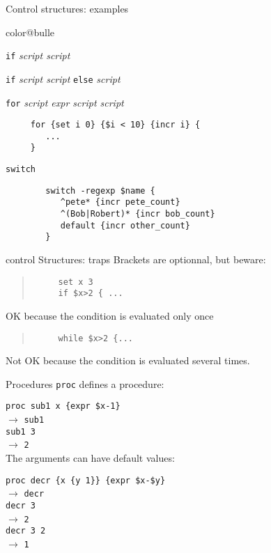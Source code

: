 \documentclass[a4paper,landscape,smooth]{show}
\newcommand{\tclex}[2]{\texttt{#1}\\$\rightarrow$ \texttt{#2}}
\begin{document}
\begin{tslide}{Control structures: examples}
   \vfill
   \begin{bitemize}{color@bulle}
      \item \texttt{if} \emph{script script}
      \item \texttt{if} \emph{script script} \texttt{else} \emph{script}
      \item \texttt{for} \emph{script expr script script} \\
      \begin{verbatim}
	 for {set i 0} {$i < 10} {incr i} {
	    ...
	 }
      \end{verbatim} %
      \item \texttt{switch} \\
	 \begin{verbatim}
	    switch -regexp $name {
	       ^pete* {incr pete_count}
	       ^(Bob|Robert)* {incr bob_count}
	       default {incr other_count}
	    }
	 \end{verbatim} %
   \end{bitemize}
   \vfill
\end{tslide}


\begin{tslide}{control Structures: traps}
   \vfill
   Brackets are optionnal, but beware:
   \begin{quote}
      \begin{verbatim}
	 set x 3
	 if $x>2 { ...
      \end{verbatim} %
   \end{quote} 
   OK because  the condition is  evaluated only once

   \vfill
   \begin{quote}
      \begin{verbatim}
	 while $x>2 {...
      \end{verbatim} %
   \end{quote} 
   Not OK because the condition is evaluated several times.
   \vfill
\end{tslide}



\begin{tslide}{Procedures}
   \vfill
   \texttt{proc} defines a procedure: 

   \tclex{proc sub1 x \{expr \$x-1\}}{sub1}\\
   \tclex{sub1 3}{2}\\

   The arguments can have default values:

   \tclex{proc decr \{x \{y 1\}\} \{expr \$x-\$y\}}{decr}\\
   \tclex{decr 3}{2}\\
   \tclex{decr 3 2}{1}
   \vfill
\end{tslide}
\end{document}
